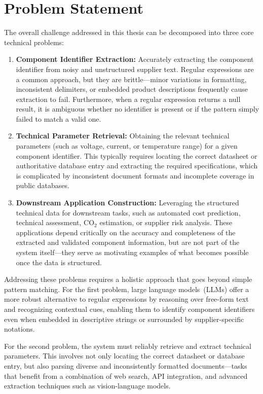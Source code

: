 \section{Problem Statement }
The overall challenge addressed in this thesis can be decomposed into three core technical problems:

\begin{enumerate}
    \item \textbf{Component Identifier Extraction:} Accurately extracting the component identifier from noisy and unstructured supplier text. Regular expressions are a common approach, but they are brittle—minor variations in formatting, inconsistent delimiters, or embedded product descriptions frequently cause extraction to fail. Furthermore, when a regular expression returns a null result, it is ambiguous whether no identifier is present or if the pattern simply failed to match a valid one.
    \item \textbf{Technical Parameter Retrieval:} Obtaining the relevant technical parameters (such as voltage, current, or temperature range) for a given component identifier. This typically requires locating the correct datasheet or authoritative database entry and extracting the required specifications, which is complicated by inconsistent document formats and incomplete coverage in public databases.
    \item \textbf{Downstream Application Construction:} Leveraging the structured technical data for downstream tasks, such as automated cost prediction, technical assessment, CO$_2$ estimation, or supplier risk analysis. These applications depend critically on the accuracy and completeness of the extracted and validated component information, but are not part of the system itself—they serve as motivating examples of what becomes possible once the data is structured.
\end{enumerate}

Addressing these problems requires a holistic approach that goes beyond simple pattern matching. For the first problem, large language models~(LLMs) offer a more robust alternative to regular expressions by reasoning over free-form text and recognizing contextual cues, enabling them to identify component identifiers even when embedded in descriptive strings or surrounded by supplier-specific notations.

For the second problem, the system must reliably retrieve and extract technical parameters. This involves not only locating the correct datasheet or database entry, but also parsing diverse and inconsistently formatted documents—tasks that benefit from a combination of web search, API integration, and advanced extraction techniques such as vision-language models.

